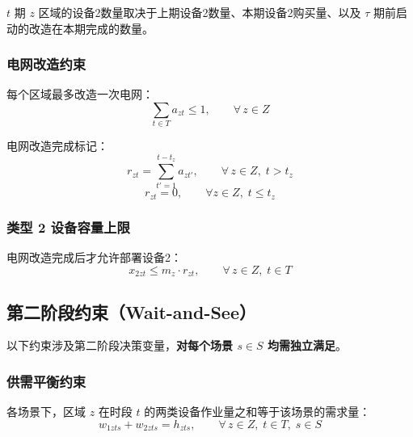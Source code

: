 \documentclass[12pt,a4paper]{article}
\newcommand{\手批注}[2]{\textcolor{#1}{\text{\kaishu #2}}}
\newcommand{\一阶段}{\textcolor{firststage}{\text{\kaishu （一阶段）}}}
\newcommand{\二阶段}{\textcolor{secondstage}{\text{\kaishu （二阶段）}}}
\begin{document}
$t$ 期 $z$ 区域的设备2数量取决于上期设备2数量、本期设备2购买量、以及 $\tau$ 期前启动的改造在本期完成的数量。

\subsubsection{电网改造约束}

每个区域最多改造一次电网：
\begin{equation}
    \sum_{t \in T} a_{zt} \leq 1, \qquad \forall \, z \in Z
    \label{eq:reform_once-s}
\end{equation}

电网改造完成标记：
\begin{equation}
    r_{zt} = \sum_{t'=1}^{t-t_z} a_{zt'},
    \qquad \forall \, z \in Z, \; t > t_z
    \label{eq:reform_cumul-s}
\end{equation}
\begin{equation}   
    r_{zt} = 0, \qquad \forall z \in Z, \; t \leq t_z
    \label{eq:reform_zero-s}
\end{equation}

\subsubsection{类型 2 设备容量上限}

电网改造完成后才允许部署设备2：
\begin{equation}
    x_{2zt} \leq m_z \cdot r_{zt}, \qquad \forall \, z \in Z, \; t \in T
    \label{eq:cap_type2-s}
\end{equation}

\subsection{第二阶段约束（Wait-and-See）}

以下约束涉及第二阶段决策变量，\textbf{对每个场景 $s \in S$ 均需独立满足}。

\subsubsection{供需平衡约束}

各场景下，区域 $z$ 在时段 $t$ 的两类设备作业量之和等于该场景的需求量：
\begin{equation}
    w_{1zts} + w_{2zts} = h_{zts}, \qquad \forall \, z \in Z, \; t \in T, \; s \in S
    \label{eq:balance-s}
\end{equation}
\end{document}

